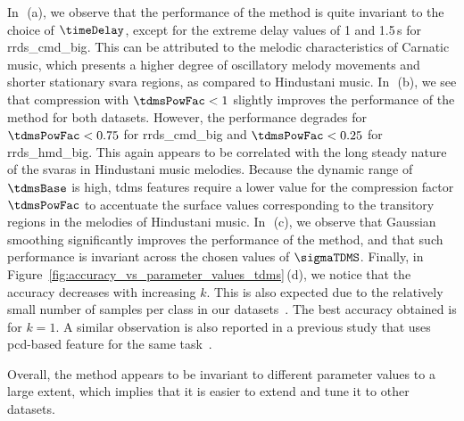 In~\,(a), we observe that the performance of the method is quite invariant to the choice of $\timeDelay$, except for the extreme delay values of 1 and 1.5\,s for \acrshort{rrds_cmd_big}. This can be attributed to the melodic characteristics of Carnatic music, which presents a higher degree of oscillatory melody movements and shorter stationary svara regions, as compared to Hindustani music. In~\,(b), we see that compression with $\tdmsPowFac < 1$ slightly improves the performance of the method for both datasets. However, the performance degrades for $\tdmsPowFac < 0.75$ for  \acrshort{rrds_cmd_big} and $\tdmsPowFac < 0.25$ for  \acrshort{rrds_hmd_big}. This again appears to be correlated with the long steady nature of the \glspl{svara} in Hindustani music melodies. Because the dynamic range of $\tdmsBase$ is high, \gls{tdms} features require a lower value for the compression factor $\tdmsPowFac$ to accentuate the surface values corresponding to the transitory regions in the melodies of Hindustani music. In~\,(c), we observe that Gaussian smoothing significantly improves the performance of the method, and that such performance is invariant across the chosen values of $\sigmaTDMS$. Finally, in Figure~\ref{fig:accuracy_vs_parameter_values_tdms}\,(d), we notice that the accuracy decreases with increasing $k$. This is also expected due to the relatively small number of samples per class in our datasets~\cite{Mitchell97BOOK}. The best accuracy obtained is for $k=1$. A similar observation is also reported in a previous study that uses \gls{pcd}-based feature for the same task~\cite{chordia2013joint}. 

Overall, the method appears to be invariant to different parameter values to a large extent, which implies that it is easier to extend and tune it to other datasets.

